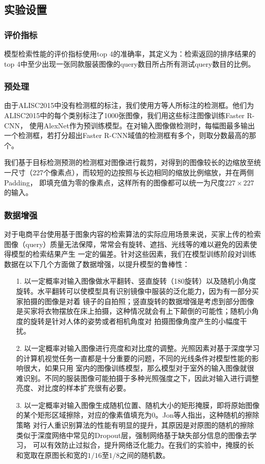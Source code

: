 \subsection{实验设置}
\subsubsection{评价指标}
模型检索性能的评价指标使用top 4的准确率，其定义为：检索返回的排序结果的top 4中至少出现一张同款服装图像的query数目所占所有测试query数目的比例。
\subsubsection{预处理}
由于ALISC2015中没有检测框的标注，我们使用方等人所标注的检测框\cite{fang2016object}。他们为ALISC2015中的每个类别标注了1000张图像，我们用这些标注图像训练Faster R-CNN，
使用AlexNet作为预训练模型。在对输入图像做检测时，每幅图最多输出一个检测框，若打分超出Faster R-CNN域值的检测框有多个，则取分数最高的那个。

我们基于目标检测预测的检测框对图像进行裁剪，对得到的图像较长的边缩放至统一尺寸（227个像素点），而较短的边按照与长边相同的缩放比例缩放，并在两侧Padding，
即填充值为零的像素点，这样所有的图像都可以统一为尺度$227 \times 227$的输入。

\subsubsection{数据增强}
对于电商平台使用基于图象内容的检索算法的实际应用场景来说，买家上传的检索图像（query）质量无法保障，常常会有旋转、遮挡、光线等的难以避免的因素使得模型的检索结果产生
一定的偏差。针对这些因素，我们在模型训练阶段对训练数据在以下几个方面做了数据增强，以提升模型的鲁棒性：
\begin{itemize}
  \item[1.]以一定概率对输入图像做水平翻转、竖直旋转（180旋转）以及随机小角度旋转。水平翻转可以使模型具有识别镜像中服装的泛化能力，因为有一部分买家拍摄的图像是对着
    镜子的自拍照；竖直旋转的数据增强是考虑到部分图像是买家将衣物摆放在床上拍摄，这种情况就会有上下颠倒的可能性；随机小角度的旋转是针对人体的姿势或者相机角度对
    拍摄图像角度产生的小幅度干扰。
  \item[2.]以一定概率对输入图像进行亮度和对比度的调整。光照因素对基于深度学习的计算机视觉任务一直都是十分重要的问题，不同的光线条件对模型性能的影响很大，如果只用
    室内的图像训练模型，那么模型对于室外的输入图像就很难识别。不同的服装图像可能拍摄于多种光照强度之下，因此对输入进行调整亮度、对比度的样本扩充很有必要。
  \item[3.]以一定概率对输入图像生成随机位置、随机大小的矩形掩膜，即将原始图像的某个矩形区域擦除，对应的像素值填充为0。Jon等人指出，这种随机的擦除策略
    对行人重识别算法的性能有明显的提升\cite{almazan2018re}，其原因是对原图的随机的擦除类似于深度网络中常见的Dropout层，强制网络基于缺失部分信息的图像去学习，
    可以有效防止过拟合，提升网络泛化能力。在我们的实验中，掩膜的长和宽取在原图长和宽的$1/16$至$1/8$之间的随机数。
\end{itemize}
    
